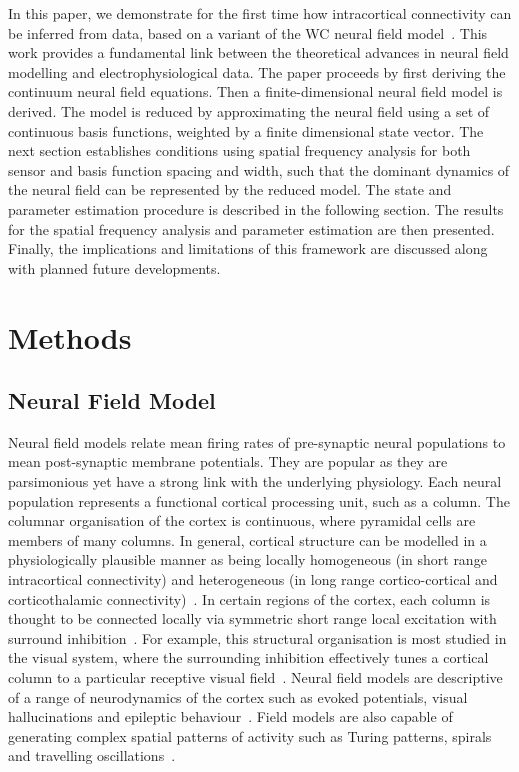 \documentclass[12pt]{iopart}
\begin{document}
In this paper, we demonstrate for the first time how intracortical connectivity can be inferred from data, based on a variant of the WC neural field model~\cite{Wilson1973}. This work provides a fundamental link between the theoretical advances in neural field modelling and electrophysiological data. The paper proceeds by first deriving the continuum neural field equations. Then a finite-dimensional neural field model is derived. The model is reduced by approximating the neural field using a set of continuous basis functions, weighted by a finite dimensional state vector. The next section establishes conditions using spatial frequency analysis for both sensor and basis function spacing and width, such that the dominant dynamics of the neural field can be represented by the reduced model. The state and parameter estimation procedure is described in the following section. The results for the spatial frequency analysis and parameter estimation are then presented. Finally, the implications and limitations of this framework are discussed along with planned future developments.

\section{Methods}

\subsection{Neural Field Model}\label{NeuralModelSection} 
Neural field models relate mean firing rates of pre-synaptic neural populations to mean post-synaptic membrane potentials. They are popular as they are parsimonious yet have a strong link with the underlying physiology. Each neural population represents a functional cortical processing unit, such as a column. The columnar organisation of the cortex is continuous, where pyramidal cells are members of many columns. In general, cortical structure can be modelled in a physiologically plausible manner as being locally homogeneous (in short range intracortical connectivity) and heterogeneous (in long range cortico-cortical and corticothalamic connectivity)~\cite{Jirsa2009,Qubbaj2007}. In certain regions of the cortex, each column is thought to be connected locally via symmetric short range local excitation with surround inhibition~\cite{Braitenberg1998}. For example, this structural organisation is most studied in the visual system, where the surrounding inhibition effectively tunes a cortical column to a particular receptive visual field~\cite{Sullivan2006}. Neural field models are descriptive of a range of neurodynamics of the cortex such as evoked potentials, visual hallucinations and epileptic behaviour~\cite{David2003,Bressloff2001,Breakspear2006}. Field models are also capable of generating complex spatial patterns of activity such as Turing patterns, spirals and travelling oscillations~\cite{Amari1977,Coombes2005,Coombes2007}.
\end{document}
